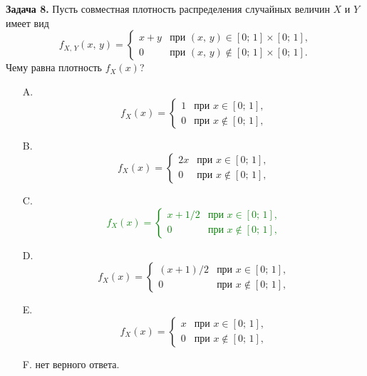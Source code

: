 \documentclass[a4paper, 12pt]{article}
\begin{document}
\textbf{Задача 8.} Пусть совместная плотность распределения случайных величин $X$ и $Y$ имеет вид
\[
    f_{X,\,Y}(x,\,y) =
    \left\{
      \begin{array}{ll}
        x + y & \text{при $(x,\,y) \in [0;\,1] \times [0;\,1]$,} \\
        0                & \text{при $(x,\,y) \not\in [0;\,1] \times [0;\,1]$.}
      \end{array}
    \right.
\]
Чему равна плотность $f_X(x)$?
\begin{itemize}
  \item[A.]
\[
    f_{X}(x) =
    \left\{
      \begin{array}{ll}
        1                & \text{при $x \in [0;\,1]$,} \\
        0                & \text{при $x \not\in [0;\,1]$,}
      \end{array}
    \right.
\]
  \item[B.]
\[
    f_{X}(x) =
    \left\{
      \begin{array}{ll}
        2x                           & \text{при $x \in [0;\,1]$,} \\
        0                           & \text{при $x \not\in [0;\,1]$,}
      \end{array}
    \right.
\]
  \item[C.] \textcolor{green}{
\[
    f_{X}(x) =
    \left\{
      \begin{array}{ll}
        x + 1/2                     & \text{при $x \in [0;\,1]$,} \\
        0                           & \text{при $x \not\in [0;\,1]$,}
      \end{array}
    \right.
\]}
  \item[D.]
\[
    f_{X}(x) =
    \left\{
      \begin{array}{ll}
        (x + 1)/2                   & \text{при $x \in [0;\,1]$,} \\
        0                           & \text{при $x \not\in [0;\,1]$,}
      \end{array}
    \right.
\]
  \item[E.]
\[
    f_{X}(x) =
    \left\{
      \begin{array}{ll}
        x                           & \text{при $x \in [0;\,1]$,} \\
        0                           & \text{при $x \not\in [0;\,1]$,}
      \end{array}
    \right.
\]
  \item[F.] нет верного ответа.
\end{itemize}
\end{document}

